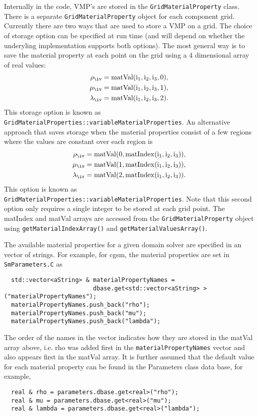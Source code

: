 Internally in the code, VMP's are stored in the {\tt GridMaterialProperty} class. There 
is a separate {\tt GridMaterialProperty} object for each component grid. 
Currently there are two ways that are used to store a VMP on a grid. The choice of
storage option can be specified at run time (and will depend on whether the underyling
implementation supports both options).
The most general
way is to save the material property at each point on the grid using a 4 dimensional array
of real values:
\begin{align*}
    \rho_\iv &= \rm{matVal}(i_1,i_2,i_3,0), \\
    \mu_\iv &= \rm{matVal}(i_1,i_2,i_3,1), \\
    \lambda_\iv &= \rm{matVal}(i_1,i_2,i_3,2). 
\end{align*}
This storage option is known as {\tt GridMaterialProperties::variableMaterialProperties}. 
An alternative approach that saves storage when the material properties consist
of a few regions where the values are constant over each region is
\begin{align*}
    \rho_\iv &= \rm{matVal}(0,\rm{matIndex}(i_1,i_2,i_3)), \\
    \mu_\iv &= \rm{matVal}(1,\rm{matIndex}(i_1,i_2,i_3)), \\
    \lambda_\iv &= \rm{matVal}(2,\rm{matIndex}(i_1,i_2,i_3)). 
\end{align*}
This option is known as {\tt GridMaterialProperties::variableMaterialProperties}.
Note that this second option only requires a single integer to be stored
at each grid point. 
The \rm{matIndex}  and \rm{matVal} arrays are accessed from the {\tt GridMaterialProperty} object
using {\tt getMaterialIndexArray()} and {\tt getMaterialValuesArray()}.

The available material properties for a given domain solver are specified in an vector of 
strings. For example, for cgsm, the material properties are set in {\tt SmParameters.C} as
\begin{verbatim}
  std::vector<aString> & materialPropertyNames = 
                         dbase.get<std::vector<aString> >("materialPropertyNames");
  materialPropertyNames.push_back("rho");
  materialPropertyNames.push_back("mu");
  materialPropertyNames.push_back("lambda");
\end{verbatim}
The order of the names in the vector indicates how they are stored in the \rm{matVal} array above, i.e. rho 
was added first in the {\tt materialPropertyNames} vector and also appears first in the \rm{matVal} array. 
It is further assumed that the default value for each material property can be found in the
Parameters class data base, for example,
\begin{verbatim}
  real & rho = parameters.dbase.get<real>("rho");
  real & mu = parameters.dbase.get<real>("mu");
  real & lambda = parameters.dbase.get<real>("lambda");
\end{verbatim}



